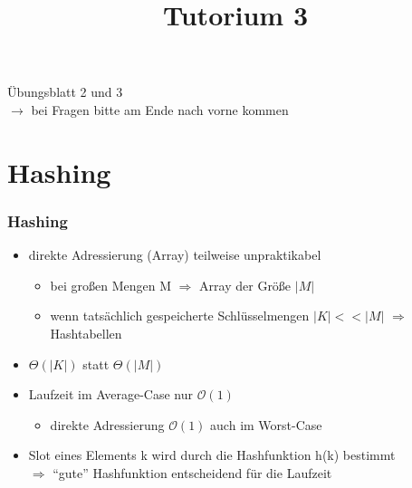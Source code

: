 
\title[Algorithmen I SS 14]{Tutorium 3}

\usepackage{alltt}





\begin{frame}
  \maketitle
\end{frame}

\begin{frame}
	\Huge
	\begin{center}
		Übungsblatt 2 und 3
		\ \\
		\normalsize
		$\rightarrow $ bei Fragen bitte am Ende nach vorne kommen
	\end{center}
\end{frame}
\section{Hashing}


	\begin{frame}
		\frametitle{Hashing}
		\begin{itemize}
			\item direkte Adressierung (Array) teilweise unpraktikabel
			\begin{itemize}
				\item bei großen Mengen M $\Rightarrow$ Array der Größe $|M|$
				\item wenn tatsächlich gespeicherte Schlüsselmengen $|K| << |M|$ $\Rightarrow$ Hashtabellen
			\end{itemize}
			\item $\Theta (|K|)$ statt $\Theta (|M|)$
			\item Laufzeit im Average-Case nur $\mathcal{O}(1)$
			\begin{itemize}
				\item direkte Adressierung $\mathcal{O}(1)$ auch im Worst-Case
			\end{itemize}
			\item Slot eines Elements k wird durch die Hashfunktion h(k) bestimmt\\
 			$\Rightarrow$ "`gute"' Hashfunktion entscheidend für die Laufzeit
		\end{itemize}
	\end{frame}


